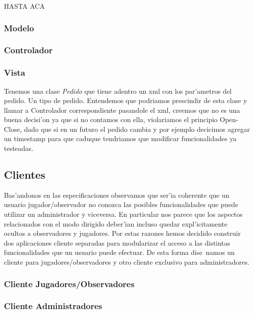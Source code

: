 \todo HASTA ACA

\subsubsection{Modelo}

\subsubsection{Controlador}

\subsubsection{Vista}

Tenemos una clase \textit{Pedido} que tiene adentro un xml con los par'ametros del pedido. Un tipo de pedido.
Entendemos que podriamos prescindir de esta clase y llamar a Controlador correspondiente pasandole el xml,
creemos que no es una buena decisi'on ya que si no contamos con ella, violariamos el principio Open-Close, dado 
que si en un futuro el pedido cambia y por ejemplo decicimos agregar un timestamp para que caduque tendriamos que 
modificar funcionalidades ya testeadas.

\subsection{Clientes}

Bas'andonos en las especificaciones observamos que ser'ia coherente que un usuario jugador/observador no conozca las posibles funcionalidades que puede utilizar un administrador y viceversa. En particular nos parece que los aspectos relacionados con el modo dirigido deber'ian incluso quedar expl'icitamente ocultos a observadores y jugadores. Por estas razones hemos decidido construir dos aplicaciones cliente separadas para modularizar el acceso a las distintas funcionalidades que un usuario puede efectuar. De esta forma dise~namos un cliente para jugadores/observadores y otro cliente exclusivo para administradores.

\subsubsection{Cliente Jugadores/Observadores}

\subsubsection{\label{Clientes::Administradores} Cliente Administradores}

